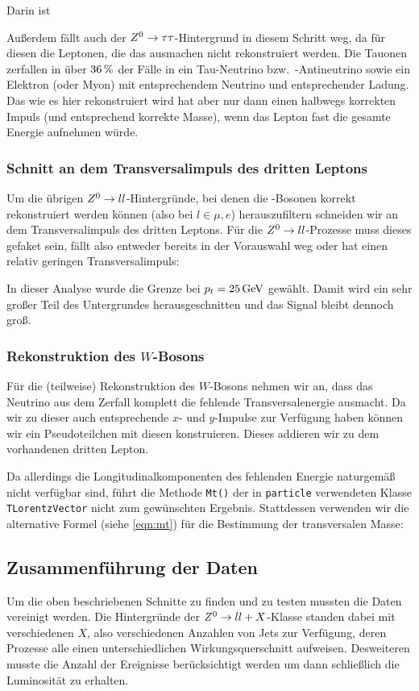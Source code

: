 Darin ist 

Außerdem fällt auch der $Z^0 \to \tau\tau$-Hintergrund in diesem Schritt weg, da
für diesen die Leptonen, die das \Z ausmachen nicht rekonstruiert werden.  Die
Tauonen zerfallen in über $\unit[36]{\%}$ der Fälle in ein Tau-Neutrino bzw.\
-Antineutrino sowie ein Elektron (oder Myon) mit entsprechendem Neutrino und
entsprechender Ladung. Das \Z wie es hier rekonstruiert wird hat aber nur dann
einen halbwegs korrekten Impuls (und entsprechend korrekte Masse), wenn das
Lepton fast die gesamte Energie aufnehmen würde.

\subsubsection{Schnitt an dem Transversalimpuls des dritten Leptons}
Um die übrigen $Z^0\to ll$-Hintergründe, bei denen die \Z-Bosonen korrekt
rekonstruiert werden können (also bei $l\in {\mu, e}$) herauszufiltern schneiden
wir an dem Transversalimpuls des dritten Leptons. Für die $Z^0\to ll$-Prozesse
muss dieses gefaket sein, fällt also entweder bereits in der Vorauswahl weg oder
hat einen relativ geringen Transversalimpuls:

In dieser Analyse wurde die Grenze bei $p_t = \unit[25]{GeV}$ gewählt. Damit
wird ein sehr großer Teil des Untergrundes herausgeschnitten und das Signal
bleibt dennoch groß.

\subsubsection{Rekonstruktion des $W$-Bosons}
Für die (teilweise) Rekonstruktion des $W$-Bosons nehmen wir an, dass das
Neutrino aus dem Zerfall komplett die fehlende Transversalenergie ausmacht. Da
wir zu dieser auch entsprechende $x$- und $y$-Impulse zur Verfügung haben können
wir ein Pseudoteilchen mit diesen konstruieren. Dieses addieren wir zu dem
vorhandenen dritten Lepton.

Da allerdings die Longitudinalkomponenten des fehlenden Energie naturgemäß nicht
verfügbar sind, führt die Methode \lstinline'Mt()' der in \lstinline'particle'
verwendeten Klasse \lstinline'TLorentzVector' nicht zum gewünschten Ergebnis.
Stattdessen verwenden wir die alternative Formel (siehe \ref{eqn:mt}) für die
Bestimmung der transversalen Masse:

\subsection{Zusammenführung der Daten}
\label{cha:normierung}
Um die oben beschriebenen Schnitte zu finden und zu testen mussten die Daten
vereinigt werden. Die Hintergründe der $Z^0\to ll + X$-Klasse standen dabei mit
verschiedenen $X$, also verschiedenen Anzahlen von Jets zur Verfügung, deren
Prozesse alle einen unterschiedlichen Wirkungsquerschnitt aufweisen. Desweiteren
musste die Anzahl der Ereignisse berücksichtigt werden um dann schließlich die
Luminosität zu erhalten.

